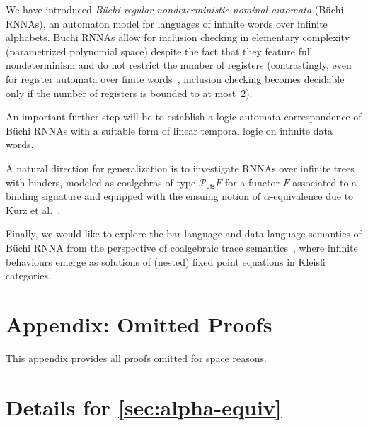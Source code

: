\documentclass[10pt,a4paper]{amsart}
\numberwithin{equation}{section}
\newcommand{\+}[1]{\mathcal{#1}\xspace}
\newcommand{\Pow}{\mathcal{P}}
\newcommand{\ufs}{{\mathsf{ufs}}}
\theoremstyle{definition}
\begin{document}
\noindent We have introduced \emph{B\"uchi regular nondeterministic
  nominal automata} (B\"uchi RNNAs), an automaton model for languages
of infinite words over infinite alphabets. B\"uchi RNNAs allow for
inclusion checking in elementary complexity (parametrized
polynomial space) despite the fact that they feature full
nondeterminism and do not restrict the number of registers
(contrastingly, even for register automata over finite
words~\cite{KaminskiFrancez94}, inclusion checking becomes decidable
only if the number of registers is bounded to at most~$2$).

 An
important further step will be to establish a logic-automata
correspondence of B\"uchi RNNAs with a suitable form of linear
temporal logic on infinite data words.

A natural direction for generalization is to investigate RNNAs over infinite trees with binders, modeled as coalgebras of type $\Pow_\ufs F$ for a functor $F$ associated to a binding signature and equipped with the ensuing notion of $\alpha$-equivalence due to Kurz et al.~\cite{kpsv13}. 

Finally, we would like to explore the bar language and data language semantics of Büchi RNNA from the perspective of coalgebraic trace semantics~\cite{ush16}, where infinite behaviours emerge as solutions of (nested) fixed point equations in Kleisli categories.




\clearpage
\appendix

\section*{Appendix: Omitted Proofs}
This appendix provides all proofs omitted for space reasons.


\section{Details for \autoref{sec:alpha-equiv}}
\end{document}
